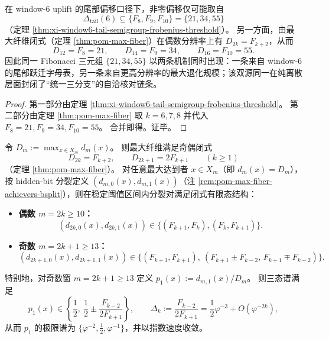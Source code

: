 \begin{corollary}\label{cor:xi-tail-offsets-maxfiber-triple-closure}
在 window-\(6\) uplift 的尾部偏移口径下，非零偏移仅可能取自
\[
\Delta_{\mathrm{tail}}(6)\subseteq \{F_8,F_9,F_{10}\}=\{21,34,55\}
\]
（定理 \ref{thm:xi-window6-tail-semigroup-frobenius-threshold}）。
另一方面，由最大纤维闭式（定理 \ref{thm:pom-max-fiber}）在偶数分辨率上有 \(D_{2k}=F_{k+2}\)，从而
\[
D_{12}=F_8=21,\qquad D_{14}=F_9=34,\qquad D_{16}=F_{10}=55.
\]
因此同一 Fibonacci 三元组 \(\{21,34,55\}\) 以两条机制同时出现：一条来自 window-\(6\) 的尾部跃迁字母表，另一条来自更高分辨率的最大退化规模；该双源同一在纯离散层面封闭了“统一三分支”的自洽核对链条。
\end{corollary}

\begin{proof}
第一部分由定理 \ref{thm:xi-window6-tail-semigroup-frobenius-threshold}。
第二部分由定理 \ref{thm:pom-max-fiber} 取 \(k=6,7,8\) 并代入 \(F_8=21,F_9=34,F_{10}=55\)。
合并即得。证毕。
\end{proof}

\begin{corollary}\label{cor:xi-max-fiber-parity-hiddenbit-finite-spectrum}
令 \(D_m:=\max_{x\in X_m}d_m(x)\)。
则最大纤维满足奇偶闭式
\[
D_{2k}=F_{k+2},\qquad D_{2k+1}=2F_{k+1}
\qquad(k\ge 1)
\]
（定理 \ref{thm:pom-max-fiber}）。
对任意最大达到者 \(x\in X_m\)（即 \(d_m(x)=D_m\)），按 hidden-bit 分裂定义 \((d_{m,0}(x),d_{m,1}(x))\)（注 \ref{rem:pom-max-fiber-achievers-bsplit}），则在稳定阈值区间内分裂对满足闭式有限态结构：
\begin{itemize}
  \item \textbf{偶数 \(m=2k\ge 10\)：}
  \[
  (d_{2k,0}(x),d_{2k,1}(x))\in\{(F_{k+1},F_k),(F_k,F_{k+1})\}.
  \]
  \item \textbf{奇数 \(m=2k+1\ge 13\)：}
  \[
  (d_{2k+1,0}(x),d_{2k+1,1}(x))\in\{(F_{k+1},F_{k+1}),\ (F_{k+1}\pm F_{k-2},\,F_{k+1}\mp F_{k-2})\}.
  \]
\end{itemize}
特别地，对奇数窗 \(m=2k+1\ge 13\) 定义
\(
p_1(x):=d_{m,1}(x)/D_m
\)。
则三态谱满足
\[
p_1(x)\in\left\{\frac12,\ \frac12\pm\frac{F_{k-2}}{2F_{k+1}}\right\},
\qquad
\Delta_k:=\frac{F_{k-2}}{2F_{k+1}}=\frac12\varphi^{-3}+O(\varphi^{-2k}),
\]
从而 \(p_1\) 的极限谱为 \(\{\varphi^{-2},\tfrac12,\varphi^{-1}\}\)，并以指数速度收敛。
\end{corollary}

